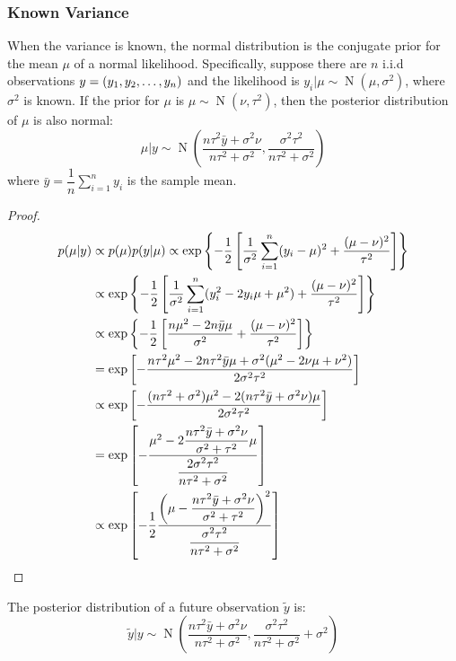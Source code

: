 \subsubsection{Known Variance}
\begin{theorem}
	When the variance is known, the normal distribution is the conjugate prior for the mean $\mu$ of a normal likelihood. Specifically, suppose there are $n$ i.i.d observations $y=(y_1, y_2, \dots, y_{n})$ and the likelihood is $y_i|\mu\sim\operatorname{N}(\mu,\sigma^2)$, where $\sigma^2$ is known. If the prior for $\mu$ is $\mu\sim\operatorname{N}(\nu,\tau^2)$, then the posterior distribution of $\mu$ is also normal:
	\begin{equation*}
		\mu|y\sim\operatorname{N}\left(\frac{n\tau^2\bar{y} + \sigma^2\nu}{n\tau^2 + \sigma^2}, \frac{\sigma^2\tau^2}{n\tau^2 + \sigma^2}\right)
	\end{equation*}
	where $\bar{y} = \dfrac{1}{n}\sum\limits_{i=1}^n y_i$ is the sample mean.
\end{theorem}
\begin{proof}
	\begin{align*}
		p(\mu|y)&\propto p(\mu)p(y|\mu)\propto
		\exp\left\{-\frac{1}{2}\left[\frac{1}{\sigma^2}\sum_{i=1}^{n}(y_i-\mu)^2+\frac{(\mu-\nu)^2}{\tau^2}\right]\right\} \\
		&\propto\exp\left\{-\frac{1}{2}\left[\frac{1}{\sigma^2}\sum_{i=1}^{n}(y_i^2-2y_i\mu+\mu^2)+\frac{(\mu-\nu)^2}{\tau^2}\right]\right\} \\
		&\propto\exp\left\{-\frac{1}{2}\left[\frac{n\mu^2-2n\bar{y}\mu}{\sigma^2}+\frac{(\mu-\nu)^2}{\tau^2}\right]\right\} \\
		&=\exp\left[-\frac{n\tau^2\mu^2-2n\tau^2\bar{y}\mu+\sigma^2(\mu^2-2\nu\mu+\nu^2)}{2\sigma^2\tau^2}\right] \\
		&\propto\exp\left[-\frac{(n\tau^2+\sigma^2)\mu^2-2(n\tau^2\bar{y}+\sigma^2\nu)\mu}{2\sigma^2\tau^2}\right] \\
		&=\exp\left[-\frac{\mu^2-2\dfrac{n\tau^2\bar{y}+\sigma^2\nu}{\sigma^2+\tau^2}\mu}{\dfrac{2\sigma^2\tau^2}{n\tau^2+\sigma^2}}\right] \\
		&\propto\exp\left[-\frac{1}{2}\frac{\left(\mu-\dfrac{n\tau^2\bar{y}+\sigma^2\nu}{\sigma^2+\tau^2}\right)^2}{\dfrac{\sigma^2\tau^2}{n\tau^2+\sigma^2}}\right]\qedhere
	\end{align*}
\end{proof}
\begin{theorem}
	The posterior distribution of a future observation $\tilde{y}$ is:
	\begin{equation*}
		\tilde{y}|y\sim\operatorname{N}\left(\frac{n\tau^2\bar{y}+\sigma^2\nu}{n\tau^2+\sigma^2},\frac{\sigma^2\tau^2}{n\tau^2+\sigma^2}+\sigma^2\right)
	\end{equation*}
\end{theorem}
